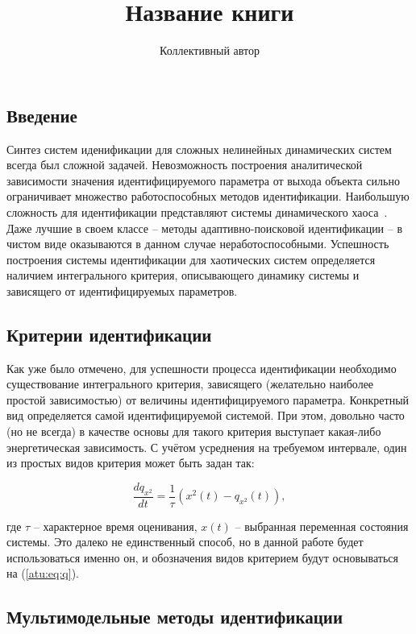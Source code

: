 \documentclass[a4paper,paratype,12pt,fouriernc]{cmonogra}
\title{Название книги}
\author{Коллективный автор}
\begin{document}
\tableofcontents



\subsection*{Введение}

Синтез систем иденификации для сложных нелинейных динамических систем
всегда был сложной задачей. Невозможность построения
аналитической зависимости значения идентифицируемого параметра
от выхода объекта сильно ограничивает множество работоспособных
методов идентификации. Наибольшую сложность для идентификации
представляют системы динамического хаоса~\cite{moon_chaotic_vibr,anisch_nonlin_eff,sprott_212}.
Даже лучшие в своем классе -- методы адаптивно-поисковой идентификации -- %
в чистом виде оказываются в данном случае неработоспособными.
Успешность построения системы идентификации для хаотических
систем определяется наличием интегрального критерия,
описывающего динамику системы и зависящего от идентифицируемых параметров.


\subsection*{Критерии идентификации}

Как уже было отмечено, для успешности процесса идентификации необходимо
существование интегрального критерия, зависящего (желательно наиболее простой зависимостью)
от величины идентифицируемого параметра. Конкретный вид определяется самой идентифицируемой
системой. При этом, довольно часто (но не всегда) в качестве основы для такого критерия выступает
какая-либо энергетическая зависимость. С учётом усреднения на требуемом интервале,
один из простых видов критерия может быть задан так:

\begin{equation}
\frac{dq_{x^2}}{dt}
=
\frac{1}{\tau} \left( x^2(t) - q_{x^2}(t) \right)
,
\label{atu:eq:q}
\end{equation}

\noindent
где $\tau$ -- характерное время оценивания, $x(t)$ -- выбранная переменная состояния системы.
Это далеко не единственный способ, но в данной работе будет использоваться именно он,
и обозначения видов критерием будут основываться на (\ref{atu:eq:q}).

\subsection*{Мультимодельные методы идентификации}
\end{document}
